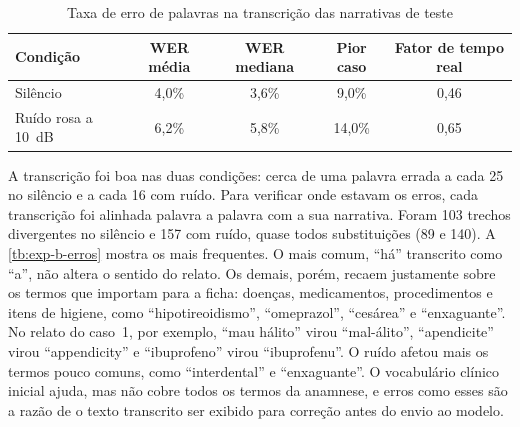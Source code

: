 \begin{table}[htbp]
	\caption{Taxa de erro de palavras na transcrição das narrativas de teste}
	\label{tb:exp-b}
	\footnotesize
	\centering
	\begin{tabular}{lcccc}
		\hline
		\textbf{Condição} & \textbf{WER média} & \textbf{WER mediana} & \textbf{Pior caso} & \textbf{Fator de tempo real} \\ \hline
		Silêncio & 4,0\% & 3,6\% & 9,0\% & 0,46 \\
		Ruído rosa a 10~dB & 6,2\% & 5,8\% & 14,0\% & 0,65 \\ \hline
	\end{tabular}
\end{table}

A transcrição foi boa nas duas condições: cerca de uma palavra errada a cada 25 no silêncio e a cada 16 com ruído. Para verificar onde estavam os erros, cada transcrição foi alinhada palavra a palavra com a sua narrativa. Foram 103 trechos divergentes no silêncio e 157 com ruído, quase todos substituições (89 e 140). A \autoref{tb:exp-b-erros} mostra os mais frequentes. O mais comum, ``há'' transcrito como ``a'', não altera o sentido do relato. Os demais, porém, recaem justamente sobre os termos que importam para a ficha: doenças, medicamentos, procedimentos e itens de higiene, como ``hipotireoidismo'', ``omeprazol'', ``cesárea'' e ``enxaguante''. No relato do caso~1, por exemplo, ``mau hálito'' virou ``mal-álito'', ``apendicite'' virou ``appendicity'' e ``ibuprofeno'' virou ``ibuprofenu''. O ruído afetou mais os termos pouco comuns, como ``interdental'' e ``enxaguante''. O vocabulário clínico inicial ajuda, mas não cobre todos os termos da anamnese, e erros como esses são a razão de o texto transcrito ser exibido para correção antes do envio ao modelo.

